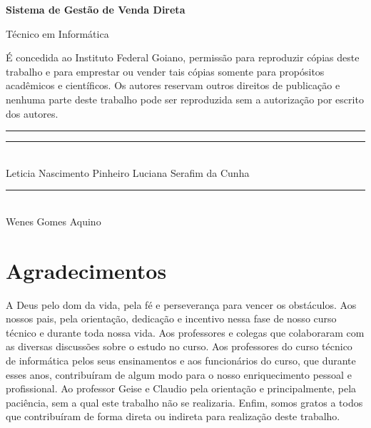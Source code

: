 \documentclass[chapter=TITLE,12pt,oneside,a4paper,english,french,sumario=tradicional,spanish,brazil,]{abntex2}
\begin{document}
\vspace{2.5cm}

{
\begin{center}
    {\LARGE \textbf{Sistema de Gestão de Venda Direta}}
\end{center}
}

\vspace{3cm}

{
\begin{center}
    {\large Técnico em Informática }\\[8mm]
\end{center}
}


É  concedida ao  Instituto  Federal  Goiano,  permissão  para  reproduzir
cópias  deste  trabalho  e  para  emprestar  ou  vender  tais  cópias  somente  para
propósitos  acadêmicos  e  científicos.  Os  autores  reservam  outros  direitos  de
publicação  e  nenhuma  parte  deste  trabalho  pode  ser  reproduzida  sem  a
autorização por escrito dos autores. \\[10mm]


\begin{center}
    \rule{7.0cm}{0.1mm}     \hspace{1.6cm}    \rule{7.0cm}{0.1mm}    \\[4mm]

Leticia Nascimento Pinheiro \hspace{3.5cm}    Luciana Serafim da Cunha \\[2cm]

                    \rule{7.0cm}{0.1mm} \\[4mm]

                         Wenes Gomes Aquino
\end{center}

\chapter*{{Agradecimentos}}\thispagestyle{empty}
\noindent A Deus pelo dom da vida, pela fé e perseverança para vencer os obstáculos.
Aos nossos pais, pela orientação, dedicação e incentivo nessa fase de nosso
curso técnico e durante toda nossa vida. Aos professores e colegas que
colaboraram com as diversas discussões sobre o estudo no curso.
Aos professores do curso técnico de informática pelos seus ensinamentos
e aos funcionários do curso, que durante esses anos, contribuíram de algum
modo para o nosso enriquecimento pessoal e profissional.
Ao professor Geise e Claudio pela orientação e principalmente, pela paciência,
sem a qual este trabalho não se realizaria. Enfim, somos gratos a todos que
contribuíram de forma direta ou indireta para realização deste trabalho.
\newpage
\end{document}
